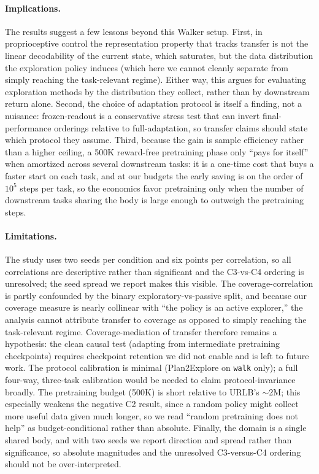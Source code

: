 \documentclass{article}
\begin{document}
\paragraph{Implications.}
The results suggest a few lessons beyond this Walker setup. First, in proprioceptive control the
representation property that tracks transfer is not the linear decodability of
the current state, which saturates, but the data distribution the exploration
policy induces (which here we cannot cleanly separate from simply reaching the
task-relevant regime). Either way, this argues for evaluating
exploration methods by the distribution they collect, rather than by downstream
return alone. Second, the choice of adaptation protocol is itself a finding, not a
nuisance: frozen-readout is a conservative stress test that can invert
final-performance orderings relative to full-adaptation, so transfer claims
should state which protocol they assume. Third, because the gain is sample
efficiency rather than a higher ceiling, a 500K reward-free pretraining phase
only ``pays for itself'' when amortized across several downstream tasks: it is a
one-time cost that buys a faster start on each task, and at our budgets the early
saving is on the order of $10^5$ steps per task, so the economics favor
pretraining only when the number of downstream tasks sharing the body is large
enough to outweigh the pretraining steps.

\paragraph{Limitations.}
The study uses two seeds per condition and six points per correlation, so all
correlations are descriptive rather than significant and the C3-vs-C4 ordering is
unresolved; the seed spread we report makes this visible. The
coverage-correlation is partly confounded by the binary exploratory-vs-passive
split, and because our coverage measure is nearly collinear with
``the policy is an active explorer,'' the analysis cannot attribute transfer to
coverage as opposed to simply reaching the task-relevant regime.
Coverage-mediation of transfer therefore remains a hypothesis: the clean causal
test (adapting from intermediate pretraining checkpoints) requires
checkpoint retention we did not enable and is left to future work. The protocol
calibration is minimal (Plan2Explore on \texttt{walk} only); a full four-way,
three-task calibration would be needed to claim protocol-invariance broadly. The
pretraining budget (500K) is short relative to URLB's $\sim$2M; this especially
weakens the negative C2 result, since a random policy might collect more useful
data given much longer, so we read ``random pretraining does not help'' as
budget-conditional rather than absolute. Finally, the domain is a single shared
body, and with two seeds we report direction and spread rather than
significance, so absolute magnitudes and the unresolved C3-versus-C4 ordering
should not be over-interpreted.
\end{document}
